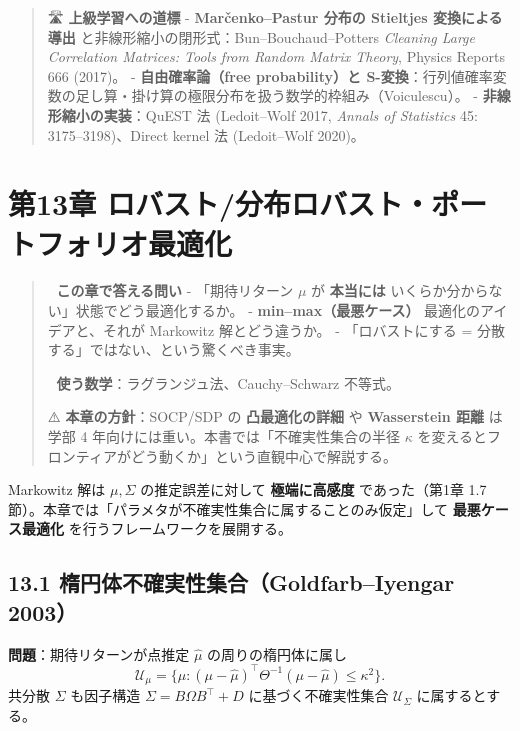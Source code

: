 \documentclass[11pt,a4paper]{report}
\begin{document}
\begin{quote}
🛣 \textbf{上級学習への道標}
- \textbf{Marčenko–Pastur 分布の Stieltjes 変換による導出} と非線形縮小の閉形式：Bun–Bouchaud–Potters \emph{Cleaning Large Correlation Matrices: Tools from Random Matrix Theory}, Physics Reports 666 (2017)。
- \textbf{自由確率論（free probability）と S-変換}：行列値確率変数の足し算・掛け算の極限分布を扱う数学的枠組み（Voiculescu）。
- \textbf{非線形縮小の実装}：QuEST 法 (Ledoit–Wolf 2017, \emph{Annals of Statistics} 45: 3175–3198)、Direct kernel 法 (Ledoit–Wolf 2020)。
\end{quote}

\noindent\hrulefill

\chapter{第13章 ロバスト/分布ロバスト・ポートフォリオ最適化}

\begin{quote}
🎯 \textbf{この章で答える問い}
- 「期待リターン $\mu$ が \textbf{本当には} いくらか分からない」状態でどう最適化するか。
- \textbf{min–max（最悪ケース）} 最適化のアイデアと、それが Markowitz 解とどう違うか。
- 「ロバストにする = 分散する」ではない、という驚くべき事実。

📐 \textbf{使う数学}：ラグランジュ法、Cauchy–Schwarz 不等式。

⚠️ \textbf{本章の方針}：SOCP/SDP の \textbf{凸最適化の詳細} や \textbf{Wasserstein 距離} は学部 4 年向けには重い。本書では「不確実性集合の半径 $\kappa$ を変えるとフロンティアがどう動くか」という直観中心で解説する。
\end{quote}

Markowitz 解は $\mu, \Sigma$ の推定誤差に対して \textbf{極端に高感度} であった（第1章 1.7 節）。本章では「パラメタが不確実性集合に属することのみ仮定」して \textbf{最悪ケース最適化} を行うフレームワークを展開する。

\section{13.1 楕円体不確実性集合（Goldfarb–Iyengar 2003）}

\textbf{問題}：期待リターンが点推定 $\hat\mu$ の周りの楕円体に属し \[ \mathcal{U}_\mu = \{ \mu : (\mu - \hat\mu)^\top \Theta^{-1} (\mu - \hat\mu) \le \kappa^2 \}. \] 共分散 $\Sigma$ も因子構造 $\Sigma = B \Omega B^\top + D$ に基づく不確実性集合 $\mathcal{U}_\Sigma$ に属するとする。
\end{document}
